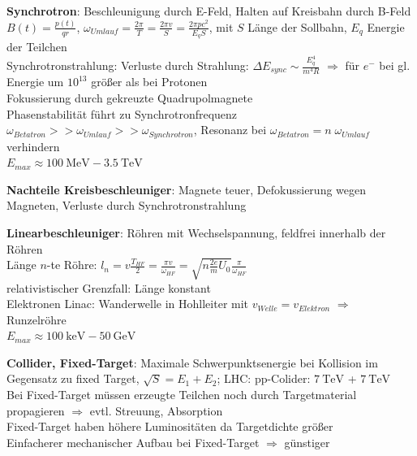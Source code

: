 \documentclass[10pt,twoside,a4paper]{article}
\begin{document}
\begin{multicols*}{3}
\textbf{Synchrotron}: Beschleunigung durch E-Feld, Halten auf Kreisbahn durch B-Feld \\
$B(t) = \frac{p(t)}{q r}$, $\omega_{Umlauf} = \frac{2 \pi}{T} = \frac{2 \pi v}{S} = \frac{2 \pi p c^2}{E_q S}$, mit $S$ Länge der Sollbahn, $E_q$ Energie der Teilchen \\
Synchrotronstrahlung: Verluste durch Strahlung: $\Delta E_{sync} \sim \frac{E^4_q}{m^4 R}$ $\Rightarrow$ für $e^-$ bei gl. Energie um $10^{13}$ größer als bei Protonen \\
Fokussierung durch gekreuzte Quadrupolmagnete \\
Phasenstabilität führt zu Synchrotronfrequenz \\
$\omega_{Betatron} >> \omega_{Umlauf} >> \omega_{Synchrotron}$, Resonanz bei $\omega_{Betatron} = n \; \omega_{Umlauf}$ verhindern \\
$E_{max} \approx \SI{100}{\mega\eV} - \SI{3.5}{\tera\eV}$

\textbf{Nachteile Kreisbeschleuniger}: Magnete teuer, Defokussierung wegen Magneten, Verluste durch Synchrotronstrahlung

\textbf{Linearbeschleuniger}: Röhren mit Wechselspannung, feldfrei innerhalb der Röhren \\
Länge $n$-te Röhre: $l_n = v \frac{T_{HF}}{2} = \frac{\pi v}{\omega_{HF}} = \sqrt{n \frac{2e}{m} U_0} \frac{\pi}{\omega_{HF}}$ \\ relativistischer Grenzfall: Länge konstant \\
Elektronen Linac: Wanderwelle in Hohlleiter mit $v_{Welle} = v_{Elektron}$ $\Rightarrow$ Runzelröhre \\
$E_{max} \approx \SI{100}{\kilo\eV} - \SI{50}{\giga\eV}$

\textbf{Collider, Fixed-Target}: Maximale Schwerpunktsenergie bei Kollision im Gegensatz zu fixed Target, $\sqrt{S} = E_1 + E_2$; LHC: pp-Colider: $\SI{7}{\tera\eV}$ + $\SI{7}{\tera\eV}$ \\
Bei Fixed-Target müssen erzeugte Teilchen noch durch Targetmaterial propagieren $\Rightarrow$ evtl. Streuung, Absorption \\
Fixed-Target haben höhere Luminositäten da Targetdichte größer \\
Einfacherer mechanischer Aufbau bei Fixed-Target $\Rightarrow$ günstiger


\end{multicols*}
\end{document}
